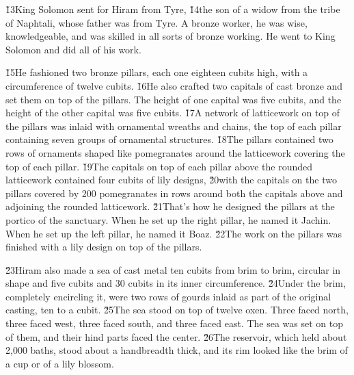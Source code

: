\v{13}King Solomon sent for Hiram from Tyre, \v{14}the son of a widow from the tribe of Naphtali, whose father was from Tyre. A bronze worker, he was wise, knowledgeable, and was skilled in all sorts of bronze working. He went to King Solomon and did all of his work.

\v{15}He fashioned two bronze pillars, each one eighteen cubits high, with a circumference of twelve cubits. \v{16}He also crafted two capitals of cast bronze and set them on top of the pillars. The height of one capital was five cubits, and the height of the other capital was five cubits. \v{17}A network of latticework on top of the pillars was inlaid with ornamental wreaths and chains, the top of each pillar containing seven groups of ornamental structures. \v{18}The pillars contained two rows of ornaments shaped like pomegranates around the latticework covering the top of each pillar. \v{19}The capitals on top of each pillar above the rounded latticework contained four cubits of lily designs, \v{20}with the capitals on the two pillars covered by 200 pomegranates in rows around both the capitals above and adjoining the rounded latticework. \v{21}That's how he designed the pillars at the portico of the sanctuary. When he set up the right pillar, he named it Jachin. When he set up the left pillar, he named it Boaz. \v{22}The work on the pillars was finished with a lily design on top of the pillars.

\v{23}Hiram also made a sea of cast metal ten cubits from brim to brim, circular in shape and five cubits and 30 cubits in its inner circumference. \v{24}Under the brim, completely encircling it, were two rows of gourds inlaid as part of the original casting, ten to a cubit. \v{25}The sea stood on top of twelve oxen. Three faced north, three faced west, three faced south, and three faced east. The sea was set on top of them, and their hind parts faced the center. \v{26}The reservoir, which held about 2,000 baths, stood about a handbreadth thick, and its rim looked like the brim of a cup or of a lily blossom.

